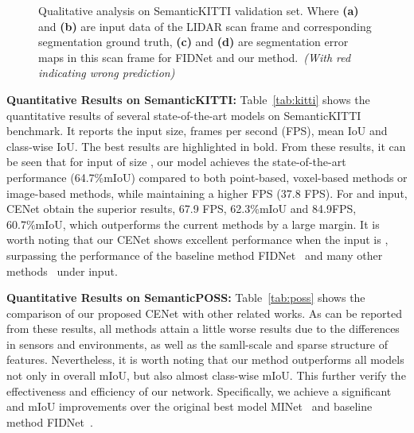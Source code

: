 \documentclass{article}
\begin{document}
\begin{figure*}[ht]
	\vspace{-5mm}
	\centering
	 \hspace{1mm}
	 \hspace{1mm}
	 \hspace{1mm}
	 \hspace{1mm}
	\vspace{-3mm}
	\caption{Qualitative analysis on SemanticKITTI validation set. Where \textbf{(a)} and \textbf{(b)} are input data of the LIDAR scan frame and corresponding segmentation ground truth, \textbf{(c)} and \textbf{(d)} are segmentation error maps in this scan frame for FIDNet and our method.~\textit{(With red indicating wrong prediction)}}
	\label{fig:view}
\end{figure*}

\noindent\textbf{Quantitative Results on SemanticKITTI:} Table~\ref{tab:kitti} shows the quantitative results of several state-of-the-art models on SemanticKITTI benchmark. It reports the input size, frames per second (FPS), mean IoU and class-wise IoU. The best results are highlighted in bold. From these results, it can be seen that for input of size , our model achieves the state-of-the-art performance (64.7\%mIoU) compared to both point-based, voxel-based methods or image-based methods, while maintaining a higher FPS (37.8 FPS). For  and  input, CENet obtain the superior results, 67.9 FPS, 62.3\%mIoU and 84.9FPS, 60.7\%mIoU, which outperforms the current methods by a large margin. It is worth noting that our CENet shows excellent performance when the input is , surpassing the performance of the baseline method FIDNet~\cite{zhao2021fidnet} and many other methods~\cite{xu2020squeezesegv3, cortinhal2020salsanext, alnaggar2021multi} under  input.


\noindent\textbf{Quantitative Results on SemanticPOSS:} Table~\ref{tab:poss} shows the comparison of our proposed CENet with other related works. As can be reported from these results, all methods attain  a little worse results due to the differences in sensors and environments, as well as the samll-scale and sparse structure of features. Nevertheless, it is worth noting that our method outperforms all models not only in overall mIoU, but also almost class-wise mIoU. This further verify the effectiveness and efficiency of our network. Specifically, we achieve a significant  and  mIoU improvements over the  original best model MINet~\cite{li2020multi} and baseline method FIDNet~\cite{zhao2021fidnet}.
\end{document}
